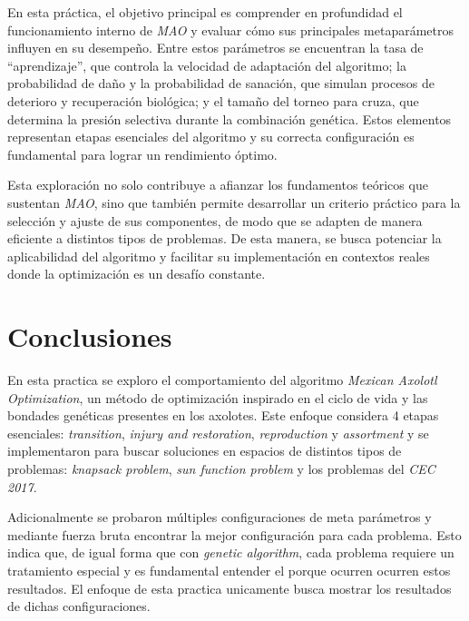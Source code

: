 \documentclass[12pt,twoside]{report}
\begin{document}
	En esta práctica, el objetivo principal es comprender en profundidad el funcionamiento interno de \textit{MAO} y evaluar cómo sus principales metaparámetros influyen en su desempeño. Entre estos parámetros se encuentran la tasa de “aprendizaje”, que controla la velocidad de adaptación del algoritmo; la probabilidad de daño y la probabilidad de sanación, que simulan procesos de deterioro y recuperación biológica; y el tamaño del torneo para cruza, que determina la presión selectiva durante la combinación genética. Estos elementos representan etapas esenciales del algoritmo y su correcta configuración es fundamental para lograr un rendimiento óptimo.
	
	Esta exploración no solo contribuye a afianzar los fundamentos teóricos que sustentan \textit{MAO}, sino que también permite desarrollar un criterio práctico para la selección y ajuste de sus componentes, de modo que se adapten de manera eficiente a distintos tipos de problemas. De esta manera, se busca potenciar la aplicabilidad del algoritmo y facilitar su implementación en contextos reales donde la optimización es un desafío constante.

	
	
	
		

	\chapter*{Conclusiones}
	
	En esta practica se exploro el comportamiento del algoritmo \textit{Mexican Axolotl Optimization}, un método de optimización inspirado en el ciclo de vida y las bondades genéticas presentes en los axolotes. Este enfoque considera 4 etapas esenciales: \textit{transition}, \textit{injury and restoration}, \textit{reproduction} y \textit{assortment} y se implementaron para buscar soluciones en espacios de distintos tipos de problemas: \textit{knapsack problem}, \textit{sun function problem} y los problemas del \textit{CEC 2017}.
	
	Adicionalmente se probaron múltiples configuraciones de meta parámetros y mediante fuerza bruta encontrar la mejor configuración para cada problema. Esto indica que, de igual forma que con \textit{genetic algorithm}, cada problema requiere un tratamiento especial y es fundamental entender el porque ocurren ocurren estos resultados. El enfoque de esta practica unicamente busca mostrar los resultados de dichas configuraciones.
	
\end{document}

